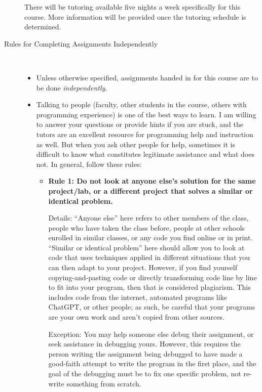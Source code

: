 \documentclass [letterpaper,11pt]{article}
\begin{document}
\begin{description}
There will be tutoring available five nights a week specifically for this course. More information will be provided
once the tutoring schedule is determined.

\item[Rules for Completing Assignments Independently]\
\begin{itemize}
        \item Unless otherwise specified, assignments handed in for this course are to be done \emph{independently}.  
        \item Talking to people (faculty, other students in the course, others with programming experience) is one of the best ways to learn.  I am willing to answer your questions or provide hints if you are stuck, and the tutors are an excellent resource for programming help and instruction as well.  But when you ask other people for help, sometimes
        it is difficult to know what constitutes legitimate assistance and what does not.  In general, follow these rules:
        
        \begin{itemize}
                \item \textbf{Rule 1: Do not look at anyone else's solution for the same project/lab, or a different project that solves a similar 
                or identical problem.}
                
                Details: ``Anyone else'' here refers to other members of the class, people who have taken the class before, people at other
                schools enrolled in similar classes, or any code you find online or in print.  ``Similar or identical problem'' here should 
                allow you to look at code that uses techniques applied in different situations that you can then 
                adapt to your project.  However, if you find yourself copying-and-pasting code or directly transforming
                code line by line to fit into your program, then that is considered plagiarism. This includes code from the internet, automated programs like ChatGPT, or other people; as such, be careful that your programs are your own work and aren't copied from other sources.\newline
                
                                
                Exception: You may help someone else debug their assignment, or seek assistance in debugging yours.  However, 
                this requires the person writing the assignment being debugged to have made a good-faith attempt
                to write the program in the first place, and the goal of the debugging must be to fix
                one specific problem, not re-write something from scratch.
                

\end{itemize}
\end{itemize}
\end{description}
\end{document}
